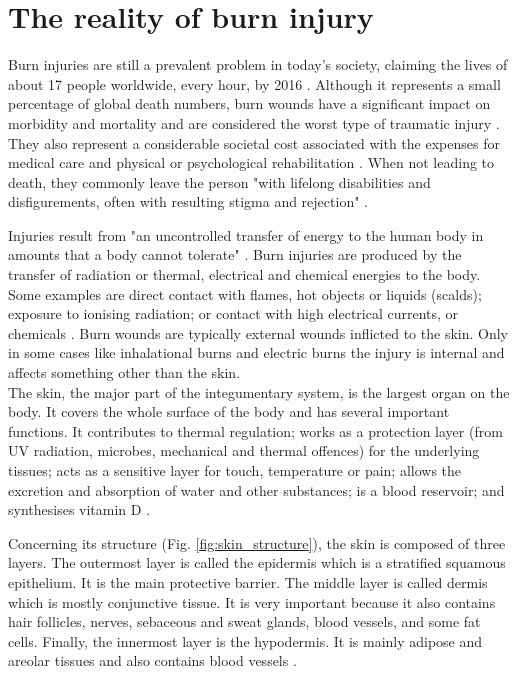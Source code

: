 \section{The reality of burn injury} %
\label{sec:the_reality_of_burn_injury}

Burn injuries are still a prevalent problem in today's society, claiming the lives of about 17 people worldwide, every hour, by 2016 \cite{GHE2016_xls}. Although it represents a small percentage of global death numbers, burn wounds have a significant impact on morbidity and mortality and are considered the worst type of traumatic injury \cite{isbi_guidelines_burn_care}. They also represent a considerable societal cost associated with the expenses for medical care and physical or psychological rehabilitation \cite{Brusselaers_2010_europe_systematic_review}. When not leading to death, they commonly leave the person "with lifelong disabilities and disfigurements, often with resulting stigma and rejection" \cite{who2011_sucess_stories}.

Injuries result from "an uncontrolled transfer of energy to the human body in amounts that a body cannot tolerate" \cite{who2011_sucess_stories}. Burn injuries are produced by the transfer of radiation or thermal, electrical and chemical energies to the body. Some examples are direct contact with flames, hot objects or liquids (scalds); exposure to ionising radiation; or contact with high electrical currents, or chemicals \cite{who_unicef2008_burns_chapter}. Burn wounds are typically external wounds inflicted to the skin. Only in some cases like inhalational burns and electric burns the injury is internal and affects something other than the skin.\\

The skin, the major part of the integumentary system, is the largest organ on the body. It covers the whole surface of the body and has several important functions. It contributes to thermal regulation; works as a protection layer (from UV radiation, microbes, mechanical and thermal offences) for the underlying tissues; acts as a sensitive layer for touch, temperature or pain; allows the excretion and absorption of water and other substances; is a blood reservoir; and synthesises vitamin D \cite{Tortora2009_principles_anatomy_physiology}. 

Concerning its structure (Fig. \ref{fig:skin_structure}), the skin is composed of three layers. The outermost layer is called the epidermis which is a stratified squamous epithelium. It is the main protective barrier. The middle layer is called dermis which is mostly conjunctive tissue.  It is very important because it also contains hair follicles, nerves, sebaceous and sweat glands, blood vessels, and some fat cells. Finally, the innermost layer is the hypodermis. It is mainly adipose and areolar tissues and also contains blood vessels \cite{Tortora2009_principles_anatomy_physiology}.\\


